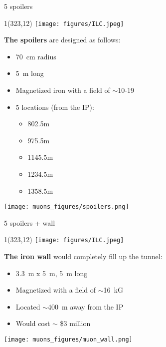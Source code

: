 \documentclass[xcolor={dvipsnames}]{beamer}
\newcommand{\ilclogo}{
  \setlength{\TPHorizModule}{1pt}
  \setlength{\TPVertModule}{1pt}
  \begin{textblock}{1}(323,12)
   \texttt{[image: figures/ILC.jpeg]}
  \end{textblock}
}
\begin{document}
\begin{frame}{5 spoilers}
\ilclogo
\textbf{The spoilers} are designed as follows:
\begin{itemize}
 \item \SI{70}{\centi\meter} radius
 \item \SI{5}{\meter} long
 \item Magnetized iron with a field of $\sim$10-\SI{19}{\kilo\gauss}
 \item 5 locations (from the IP):
 \begin{itemize}
  \item 802.5m
  \item 975.5m
  \item 1145.5m
  \item 1234.5m
  \item 1358.5m
 \end{itemize}

\end{itemize}
\begin{center}
\texttt{[image: muons\_figures/spoilers.png]}
\end{center}
\end{frame}

\begin{frame}{5 spoilers + wall}
\ilclogo
\textbf{The iron wall} would completely fill up the tunnel:
\begin{itemize}
 \item \SI{3.3}{\meter} x \SI{5}{\meter}, \SI{5}{\meter} long
 \item Magnetized with a field of $\sim$\SI{16}{kG}
 \item Located $\sim$\SI{400}{\meter} away from the IP
 \item Would cost $\sim$ \$3 million
\end{itemize}
\begin{center}
\texttt{[image: muons\_figures/muon\_wall.png]}
\end{center}
\end{frame}

\end{document}
